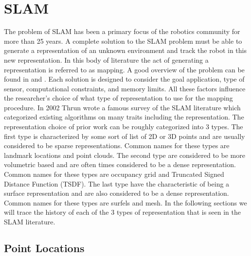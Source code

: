\section{SLAM}

The problem of SLAM has been a primary focus of the robotics community for
more than 25 years. A complete solution to the SLAM problem must be able to
generate a representation of an unknown environment and track the robot in
this new representation. In this body of literature the act of generating a
representation is referred to as mapping. A good overview of the problem
can be found in \cite{Durrant-Whyte2006} and \cite{Bailey2006}. Each
solution is designed to consider the goal application, type of sensor,
computational constraints, and memory limits. All these factors influence
the researcher's choice of what type of representation to use for the
mapping procedure. In 2002 Thrun wrote a famous survey \cite{Thrun2002} of
the SLAM literature which categorized existing algorithms on many traits
including the representation. The representation choice of prior work can
be roughly categorized into 3 types. The first type is characterized by
some sort of list of 2D or 3D points and are usually considered to be
sparse representations. Common names for these types are landmark locations
and point clouds. The second type are considered to be more volumetric
based and are often times considered to be a dense representation. Common
names for these types are occupancy grid and Truncated Signed Distance
Function (TSDF). The last type have the characteristic of being a surface
representation and are also considered to be a dense representation. Common
names for these types are surfels and mesh. In the following sections we
will trace the history of each of the 3 types of representation that is
seen in the SLAM literature.

\subsection{Point Locations}

